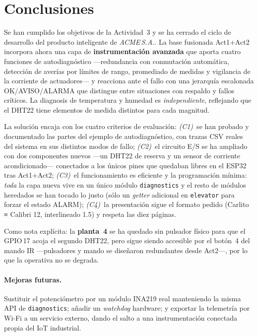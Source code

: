 \section{Conclusiones}
\label{sec:conclusiones}

Se han cumplido los objetivos de la Actividad~3 y se ha cerrado el ciclo de
desarrollo del producto inteligente de \emph{ACME\,S.A.}. La base fusionada
Act1+Act2 incorpora ahora una capa de \textbf{instrumentación avanzada} que
aporta cuatro funciones de autodiagnóstico ---redundancia con conmutación
automática, detección de averías por límites de rango, promediado de medidas
y vigilancia de la corriente de actuadores--- y reacciona ante el fallo con
una jerarquía escalonada \textsf{OK}/\textsf{AVISO}/\textsf{ALARMA} que
distingue entre situaciones con respaldo y fallos críticos. La diagnosis de
temperatura y humedad es \emph{independiente}, reflejando que el DHT22 tiene
elementos de medida distintos para cada magnitud.

La solución encaja con los cuatro criterios de evaluación: \emph{(C1)}\
se han probado y documentado las partes del ejemplo de autodiagnóstico, con
trazas CSV reales del sistema en sus distintos modos de fallo;
\emph{(C2)}\ el circuito E/S se ha ampliado con dos componentes nuevos ---un
DHT22 de reserva y un sensor de corriente acondicionado--- conectados a los
únicos pines que quedaban libres en el ESP32 tras Act1+Act2;
\emph{(C3)}\ el funcionamiento es eficiente y la programación mínima:
\emph{toda} la capa nueva vive en un único módulo \texttt{diagnostics} y el
resto de módulos heredados se han tocado lo justo (sólo un \emph{getter}
adicional en \texttt{elevator} para forzar el estado \textsf{ALARM});
\emph{(C4)}\ la presentación sigue el formato pedido (Carlito ≡
Calibri 12, interlineado 1.5) y respeta las diez páginas.

Como nota explícita: la \textbf{planta~4} se ha quedado sin pulsador físico
para que el GPIO\,17 acoja el segundo DHT22, pero sigue siendo accesible por
el botón~4 del mando IR ---pulsadores y mando se diseñaron redundantes desde
Act2---, por lo que la operativa no se degrada.

\paragraph{Mejoras futuras.} Sustituir el potenciómetro por un módulo INA219
real manteniendo la misma API de \texttt{diagnostics}; añadir un
\emph{watchdog} hardware; y exportar la telemetría por Wi-Fi a un servicio
externo, dando el salto a una instrumentación conectada propia del IoT
industrial.
